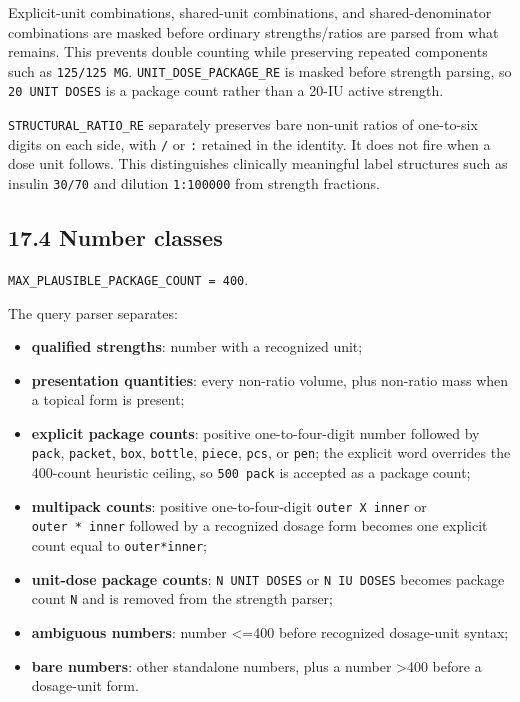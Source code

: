 Explicit-unit combinations, shared-unit combinations, and shared-denominator combinations are masked before ordinary strengths/ratios are parsed from what remains. This prevents double counting while preserving repeated components such as \texttt{125/125\ MG}. \texttt{UNIT\_\allowbreak{}DOSE\_\allowbreak{}PACKAGE\_\allowbreak{}RE} is masked before strength parsing, so \texttt{20\ UNIT\ DOSES} is a package count rather than a 20-IU active strength.

\texttt{STRUCTURAL\_\allowbreak{}RATIO\_\allowbreak{}RE} separately preserves bare non-unit ratios of one-to-six digits on each side, with \texttt{/} or \texttt{:} retained in the identity. It does not fire when a dose unit follows. This distinguishes clinically meaningful label structures such as insulin \texttt{30/70} and dilution \texttt{1:100000} from strength fractions.

\subsection{17.4 Number classes}\label{174-number-classes}

\texttt{MAX\_\allowbreak{}PLAUSIBLE\_\allowbreak{}PACKAGE\_\allowbreak{}COUNT\ =\ 400}.

The query parser separates:

\begin{itemize}
\tightlist
\item
  \textbf{qualified strengths}: number with a recognized unit;
\item
  \textbf{presentation quantities}: every non-ratio volume, plus non-ratio mass when a topical form is present;
\item
  \textbf{explicit package counts}: positive one-to-four-digit number followed by \texttt{pack}, \texttt{packet}, \texttt{box}, \texttt{bottle}, \texttt{piece}, \texttt{pcs}, or \texttt{pen}; the explicit word overrides the 400-count heuristic ceiling, so \texttt{500\ pack} is accepted as a package count;
\item
  \textbf{multipack counts}: positive one-to-four-digit \texttt{outer\ X\ inner} or \texttt{outer\ *\ inner} followed by a recognized dosage form becomes one explicit count equal to \texttt{outer*inner};
\item
  \textbf{unit-dose package counts}: \texttt{N\ UNIT\ DOSES} or \texttt{N\ IU\ DOSES} becomes package count \texttt{N} and is removed from the strength parser;
\item
  \textbf{ambiguous numbers}: number \textless=400 before recognized dosage-unit syntax;
\item
  \textbf{bare numbers}: other standalone numbers, plus a number \textgreater400 before a dosage-unit form.
\end{itemize}

